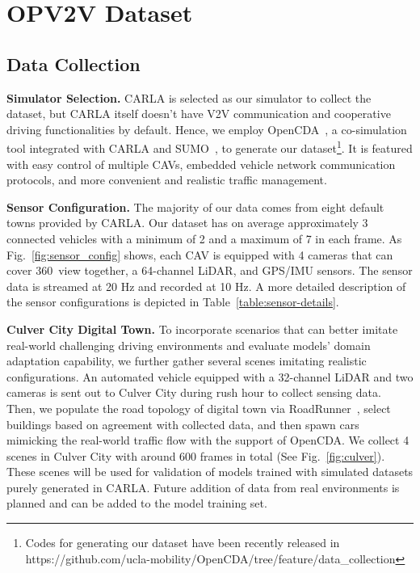 \documentclass[letterpaper, 10 pt, conference]{ieeeconf}
\begin{document}
\section{OPV2V Dataset}
\subsection{Data Collection}
\noindent\textbf{Simulator Selection.} CARLA is selected as our simulator to collect the dataset, but CARLA itself doesn't have V2V communication and cooperative driving functionalities by default. Hence, we employ OpenCDA~\cite{xu2021opencda}, a co-simulation tool integrated with CARLA and SUMO~\cite{OlaverriMonreal2018ConnectionOT}, to generate our dataset\footnote{Codes for generating our dataset have been recently released in https://github.com/ucla-mobility/OpenCDA/tree/feature/data\_collection}. It is featured with easy control of multiple CAVs, embedded vehicle network communication protocols, and more convenient and realistic traffic management.  

\noindent\textbf{Sensor Configuration.} The majority of our data comes from eight default towns provided by CARLA.  Our dataset has on average approximately 3 connected vehicles with a minimum of 2 and a maximum of 7 in each frame. As Fig.~\ref{fig:sensor_config} shows, each CAV is equipped with 4 cameras that can cover 360\degree~view together, a 64-channel LiDAR, and GPS/IMU sensors.  The sensor data is streamed at 20 Hz and recorded at 10 Hz. A more detailed description of the sensor configurations is depicted in Table~\ref{table:sensor-details}.




\noindent\textbf{Culver City Digital Town.} To incorporate scenarios that can better imitate real-world challenging driving environments and evaluate models' domain adaptation capability, we further gather several scenes imitating realistic configurations. An automated vehicle equipped with a 32-channel LiDAR and two cameras is sent out to Culver City during rush hour to collect sensing data. Then, we populate the road topology of digital town via RoadRunner~\cite{roadrunner}, select buildings based on agreement with collected data, and then spawn cars mimicking the real-world traffic flow with the support of OpenCDA. We collect 4 scenes in Culver City with around 600 frames in total (See Fig.~\ref{fig:culver}). These scenes will be used for validation of models trained with simulated datasets purely generated in CARLA. Future addition of data from real environments is planned and can be added to the model training set.
\end{document}
